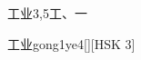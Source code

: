 \begin{entry}{工业}{3,5}{⼯、⼀}
  \begin{phonetics}{工业}{gong1ye4}[][HSK 3]
  \end{phonetics}
\end{entry}
